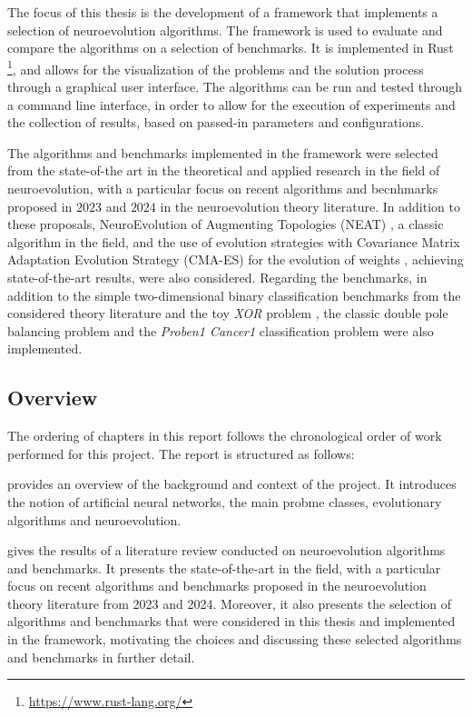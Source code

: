 The focus of this thesis is the development of a framework that implements a selection of neuroevolution algorithms.
The framework is used to evaluate and compare the algorithms on a selection of benchmarks.
It is implemented in Rust \footnote{\url{https://www.rust-lang.org/}}, and allows for the visualization of the problems and the solution process through a graphical user interface.
The algorithms can be run and tested through a command line interface, in order to allow for the execution of experiments and the collection of results,
based on passed-in parameters and configurations.

The algorithms and benchmarks implemented in the framework were selected from the state-of-the art in the theoretical and applied research in the field of neuroevolution,
with a particular focus on recent algorithms and becnhmarks proposed in $2023$ and $2024$ in the neuroevolution theory literature.
In addition to these proposals, NeuroEvolution of Augmenting Topologies (NEAT) \cite{neat}, a classic algorithm in the field, and the use of evolution strategies with
Covariance Matrix Adaptation Evolution Strategy (CMA-ES) for the evolution of weights \cite{cmaes}, achieving state-of-the-art results, were also considered.
Regarding the benchmarks, in addition to the simple two-dimensional binary classification benchmarks from the considered theory literature \cite{na,bna} and the toy \textit{XOR}
problem \cite{neat}, the classic double pole balancing problem \cite{pole_balancing} and the \textit{Proben1 Cancer1} \cite{proben} classification problem were also implemented.

\subsection{Overview}

The ordering of chapters in this report follows the chronological order of work performed for this project.
The report is structured as follows:

 provides an overview of the background and context of the project. It introduces the notion of artificial neural networks, the main probme classes,
evolutionary algorithms and neuroevolution.

 gives the results of a literature review conducted on neuroevolution algorithms and benchmarks. It presents the state-of-the-art in the field,
with a particular focus on recent algorithms and benchmarks proposed in the neuroevolution theory literature from 2023 and 2024.
Moreover, it also presents the selection of algorithms and benchmarks that were considered in this thesis and implemented in the framework, motivating the choices and
discussing these selected algorithms and benchmarks in further detail.

